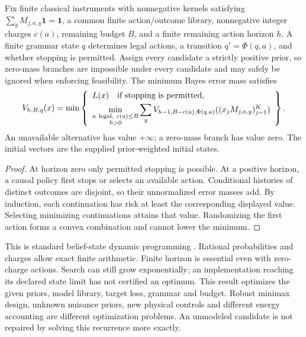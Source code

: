 \begin{proposition}
\label{precision:bellman}
Fix finite classical instruments with nonnegative kernels satisfying
$\sum_y M_{j,a,y}\mathbf1=\mathbf1$, a common finite action/outcome library,
nonnegative integer charges $c(a)$, remaining budget $B$, and a finite remaining
action horizon $h$. A finite grammar state
$q$ determines legal actions, a transition $q'=\Phi(q,a)$, and whether stopping
is permitted. Assign every candidate a strictly positive prior, so zero-mass
branches are impossible under every candidate and may safely be ignored when
enforcing feasibility. The minimum Bayes error mass satisfies
\begin{equation}
 V_{h,B,q}(x)=\min\left\{
 \begin{array}{l}
 L(x)\quad\hbox{if stopping is permitted},\\[1mm]
 \displaystyle\min_{\substack{a\ \mathrm{legal},\ c(a)\leq B\\h>0}}
       \sum_y V_{h-1,B-c(a),\Phi(q,a)}
       ((x_jM_{j,a,y})_{j=1}^K)
 \end{array}\right\}.
 \label{precision:bellman-equation}
\end{equation}
An unavailable alternative has value $+\infty$; a zero-mass branch has value
zero. The initial vectors are the supplied prior-weighted initial states.
\end{proposition}
\begin{proof}
At horizon zero only permitted stopping is possible. At a positive horizon, a
causal policy first stops or selects an available action. Conditional histories
of distinct outcomes are disjoint, so their unnormalized error masses add.
By induction, each continuation has risk at least the corresponding displayed
value. Selecting minimizing continuations attains that value. Randomizing the
first action forms a convex combination and cannot lower the minimum.
\end{proof}

This is standard belief-state dynamic programming \cite{caBellman1957}.
Rational probabilities and charges allow exact finite arithmetic. Finite horizon
is essential even with zero-charge actions. Search can still grow exponentially;
an implementation reaching its declared state limit has not certified an
optimum. This result optimizes the given priors, model library, target loss,
grammar and budget. Robust minimax design, unknown nuisance priors, new physical
controls and different energy accounting are different optimization problems.
An unmodeled candidate is not repaired by solving this recurrence more exactly.

